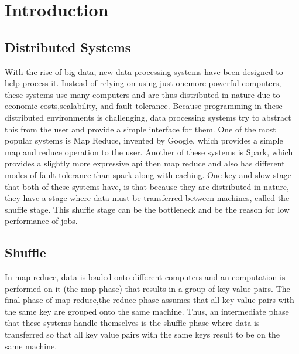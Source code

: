 \chapter{Introduction}\label{intro-ch}

\section{Distributed Systems}


With the rise of big data, new data processing systems have been designed to help process it. 
Instead of relying on using just onemore powerful computers, these systems use many computers and are thus distributed in nature due to economic costs,scalability, and fault tolerance. Because programming in these  distributed environments is challenging, data processing systems
try to abstract this from the user and provide a simple interface for them. One of the most popular systems is Map Reduce,
invented by Google, which provides a simple map and reduce operation to the user. Another of these systems is Spark, which provides
a slightly more expressive api then map reduce and also has different modes of fault tolerance than spark along with caching. 
One key and slow stage that both of these systems have, is that because they are distributed in nature, they have a stage
where data must be transferred between machines, called the shuffle stage. This shuffle stage can be the bottleneck and be the reason for low performance of jobs.
\section{Shuffle} 

In map reduce, data is loaded onto different computers and an computation is performed on it (the map phase) that results 
in a group of key value pairs. The final phase of map reduce,the reduce phase assumes that all key-value pairs with the same
key are grouped onto the same machine. Thus, an intermediate phase that these systems handle themselves is the shuffle phase where
data is transferred so that all key value pairs with the same keys result to be on the same machine. 
\\

